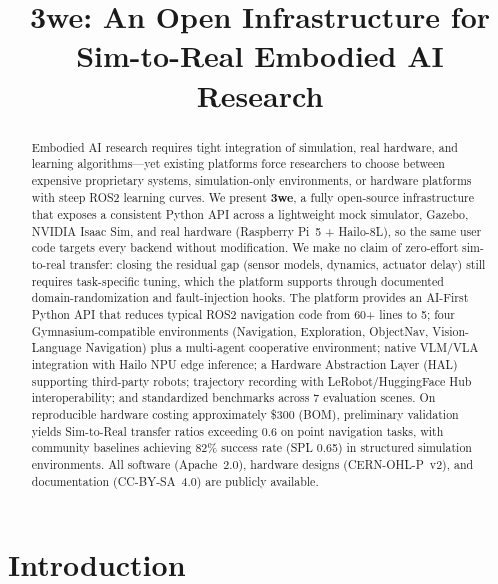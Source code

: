 \documentclass[conference]{IEEEtran}
\begin{document}
\title{3we: An Open Infrastructure for Sim-to-Real Embodied AI Research}

\author{
}

\maketitle

\begin{abstract}
Embodied AI research requires tight integration of simulation, real hardware, and learning algorithms---yet existing platforms force researchers to choose between expensive proprietary systems, simulation-only environments, or hardware platforms with steep ROS2 learning curves.
We present \textbf{3we}, a fully open-source infrastructure that exposes a consistent Python API across a lightweight mock simulator, Gazebo, NVIDIA Isaac Sim, and real hardware (Raspberry Pi~5 + Hailo-8L), so the same user code targets every backend without modification. We make no claim of zero-effort sim-to-real transfer: closing the residual gap (sensor models, dynamics, actuator delay) still requires task-specific tuning, which the platform supports through documented domain-randomization and fault-injection hooks.
The platform provides an AI-First Python API that reduces typical ROS2 navigation code from 60+ lines to 5; four Gymnasium-compatible environments (Navigation, Exploration, ObjectNav, Vision-Language Navigation) plus a multi-agent cooperative environment; native VLM/VLA integration with Hailo NPU edge inference; a Hardware Abstraction Layer (HAL) supporting third-party robots; trajectory recording with LeRobot/HuggingFace Hub interoperability; and standardized benchmarks across 7 evaluation scenes.
On reproducible hardware costing approximately \$300 (BOM), preliminary validation yields Sim-to-Real transfer ratios exceeding 0.6 on point navigation tasks, with community baselines achieving 82\% success rate (SPL 0.65) in structured simulation environments.
All software (Apache~2.0), hardware designs (CERN-OHL-P~v2), and documentation (CC-BY-SA~4.0) are publicly available.
\end{abstract}

\section{Introduction}
\end{document}
